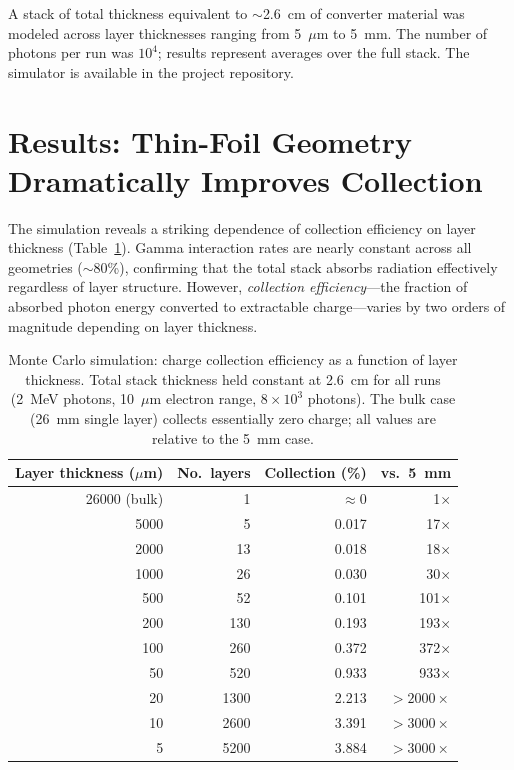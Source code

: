 \documentclass[12pt]{article}
\begin{document}
A stack of total thickness equivalent to $\sim$2.6~cm of converter material was modeled
across layer thicknesses ranging from 5~$\mu$m to 5~mm. The number of photons per run
was $10^4$; results represent averages over the full stack. The simulator is available
in the project repository.

\section{Results: Thin-Foil Geometry Dramatically Improves Collection}
\label{sec:results}

The simulation reveals a striking dependence of collection efficiency on layer thickness
(Table~\ref{tab:thickness}). Gamma interaction rates are nearly constant across all
geometries ($\sim$80\%), confirming that the total stack absorbs radiation effectively
regardless of layer structure. However, \emph{collection efficiency}---the fraction of
absorbed photon energy converted to extractable charge---varies by two orders of
magnitude depending on layer thickness.

\begin{table}[h]
\centering
\caption{Monte Carlo simulation: charge collection efficiency as a function of layer
thickness. Total stack thickness held constant at 2.6~cm for all runs (2~MeV photons,
10~$\mu$m electron range, $8\times10^3$ photons). The bulk case (26~mm single layer)
collects essentially zero charge; all values are relative to the 5~mm case.}
\label{tab:thickness}
\begin{tabular}{rrrr}
\toprule
Layer thickness ($\mu$m) & No.\ layers & Collection (\%) & vs.\ 5~mm \\
\midrule
26000 (bulk) & 1    & $\approx 0$  & 1$\times$ \\
5000         & 5    & 0.017        & 17$\times$ \\
2000         & 13   & 0.018        & 18$\times$ \\
1000         & 26   & 0.030        & 30$\times$ \\
500          & 52   & 0.101        & 101$\times$ \\
200          & 130  & 0.193        & 193$\times$ \\
100          & 260  & 0.372        & 372$\times$ \\
50           & 520  & 0.933        & 933$\times$ \\
20           & 1300 & 2.213        & $>2000\times$ \\
10           & 2600 & 3.391        & $>3000\times$ \\
5            & 5200 & 3.884        & $>3000\times$ \\
\bottomrule
\end{tabular}
\end{table}
\end{document}
